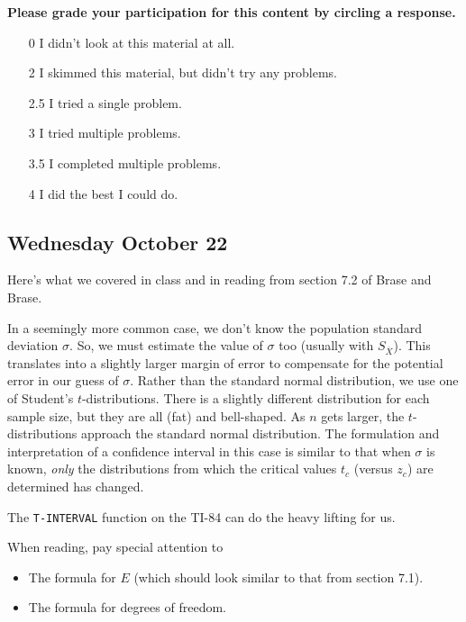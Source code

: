\documentclass{ccg-topic}
\begin{document}
\textbf{Please grade your participation for this content by circling a response.}

\begin{enumerate}
    \item[0] I didn't look at this material at all.
    \item[2] I skimmed this material, but didn't try any problems.
    \item[2.5] I tried a single problem.
    \item[3] I tried multiple problems.
    \item[3.5] I completed multiple problems.
    \item[4] I did the best I could do.
\end{enumerate}

\subsection*{Wednesday October 22}

Here's what we covered in class and in reading from section 7.2 of Brase and Brase. 

    In a seemingly more common case, we don’t know the population standard deviation $\sigma$. So, we must estimate the value of $\sigma$ too (usually with $S_{\overline{X}}$). This translates into a slightly larger margin of error to compensate for the potential error in our guess of $\sigma$. Rather than the standard normal distribution, we use one of Student's $t$-distributions. There is a slightly different distribution for each sample size, but they are all (fat) and bell-shaped.  As $n$ gets larger, the $t$-distributions approach the standard normal distribution. The formulation and interpretation of a confidence interval in this case is similar to that when $\sigma$ is known, \emph{only} the distributions from which the critical values $t_c$ (versus $z_c$) are determined has changed.
    
    The \texttt{T-INTERVAL} function on the TI-84 can do the heavy lifting for us.
    
    When reading, pay special attention to
    
        \begin{itemize}
        
            \item The formula for $E$ (which should look similar to that from section 7.1).
            
            \item The formula for degrees of freedom.
            
        \end{itemize}
        
\end{document}
